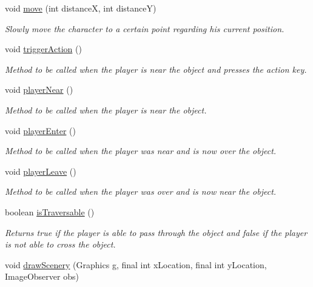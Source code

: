 \begin{DoxyCompactItemize}
void \hyperlink{a00005_a69468dde4db9cb9e4ce0838dc6977c8c}{move} (int distance\-X, int distance\-Y)
\begin{DoxyCompactList}\small\item\em Slowly move the character to a certain point regarding his current position. \end{DoxyCompactList}\item 
void \hyperlink{a00005_afcf977fccc24a077f5445e2a4e73836a}{trigger\-Action} ()
\begin{DoxyCompactList}\small\item\em Method to be called when the player is near the object and presses the action key. \end{DoxyCompactList}\item 
void \hyperlink{a00005_a367d28c710b44853dd42daf2f35d1de8}{player\-Near} ()
\begin{DoxyCompactList}\small\item\em Method to be called when the player is near the object. \end{DoxyCompactList}\item 
void \hyperlink{a00005_a9e727e0924694a8dcb032d6bb61b30d9}{player\-Enter} ()
\begin{DoxyCompactList}\small\item\em Method to be called when the player was near and is now over the object. \end{DoxyCompactList}\item 
void \hyperlink{a00005_a94b4af7f2a48ad7288e64be4393ffeb2}{player\-Leave} ()
\begin{DoxyCompactList}\small\item\em Method to be called when the player was over and is now near the object. \end{DoxyCompactList}\item 
boolean \hyperlink{a00005_afe899056167497ab0de734cd2f19219a}{is\-Traversable} ()
\begin{DoxyCompactList}\small\item\em Returns true if the player is able to pass through the object and false if the player is not able to cross the object. \end{DoxyCompactList}\item 
void \hyperlink{a00024_a626c1ae7fa15d2f96d564c35368fdbc9}{draw\-Scenery} (Graphics g, final int x\-Location, final int y\-Location, Image\-Observer obs)
\end{DoxyCompactItemize}
